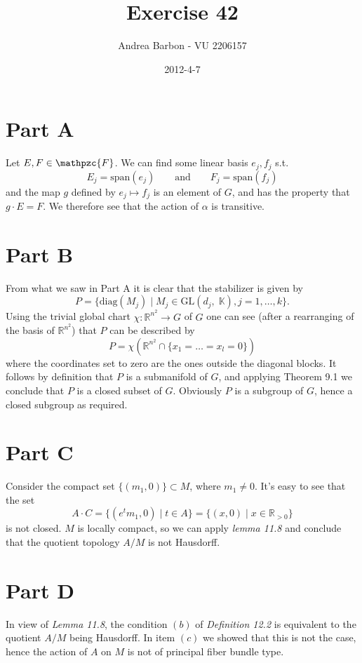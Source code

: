 \documentclass[]{article}
\title{Exercise 42}
\author{ Andrea Barbon - VU 2206157 }
\date{2012-4-7}
\newcommand{\AND}{\qquad \text{and} \qquad}
\begin{document}
\ifpdf
{}
\else
{}
\fi

\maketitle

\section{Part A}
Let $E,F \in \mathpzc{F} $. We can find some linear basis $e_j,f_j$ s.t. 
$$ E_j = \text{span}(e_j) \AND F_j = \text{span}(f_j) $$
and the map $ g $ defined by $e_j \mapsto f_j$ is an element of $G$, and has the property that $ g\cdot E=F $. We therefore see that the action of $\alpha$ is transitive.

\section{Part B}
From what we saw in Part A it is clear that the stabilizer is given by $$ P=\{ \text{diag}(M_j) \mid M_j \in \text{GL}(d_j,\;\mathbb{K}), j=1,\dots,k \}. $$
Using the trivial global chart $\chi:\mathbb{R}^{n^2}\to G$ of $G$ one can see (after a rearranging of the basis of $\mathbb{R}^{n^2}$) that $P$ can be described by $$ P=\chi(\mathbb{R}^{n^2} \cap \{x_1=\dots=x_l=0\}) $$ where the coordinates set to zero are the ones outside the diagonal blocks. It follows by definition that $P$ is a submanifold of $G$, and applying Theorem 9.1 we conclude that $P$ is a closed subset of $G$. Obviously $P$ is a subgroup of $G$, hence a closed subgroup as required.


\section{Part C}
Consider the compact set $\{ (m_1, 0) \} \subset M $, where $m_1 \neq 0$. It's easy to see that the set $$ A \cdot C = \{(e^t m_1,0) \mid t\in A\} = \{(x,0) \mid x\in \mathbb{R}_{>0} \} $$ is not closed. $M$ is locally compact, so we can apply \emph{lemma 11.8} and conclude that the quotient topology $A / M$ is not Hausdorff.


\section{Part D}

In view of \emph{Lemma 11.8}, the condition $(b)$ of \emph{Definition 12.2} is equivalent to the quotient $A / M$ being Hausdorff. In item $(c)$ we showed that this is not the case, hence the action of $A$ on $M$ is not of principal fiber bundle type. 
\end{document}
